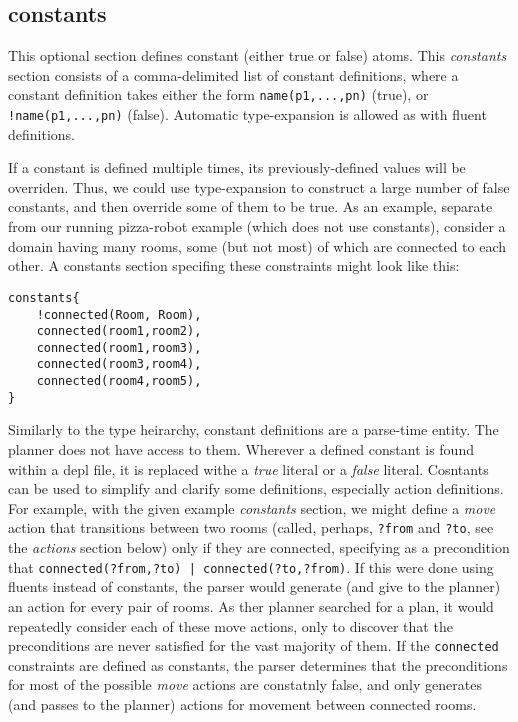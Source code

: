 \documentclass{article}
\begin{document}
{\subsection{constants}

This optional section defines constant (either true or false) atoms. This
\emph{constants} section consists of a comma-delimited list of constant
definitions, where a constant definition takes either the form
\verb|name(p1,...,pn)| (true), 
or
\verb|!name(p1,...,pn)| (false).
Automatic type-expansion is allowed as with fluent definitions.

If a constant is defined multiple times, its previously-defined values will be
overriden. Thus, we could use type-expansion to construct
a large number of false constants, and then
override some of them to be true. As an example, separate from our
running pizza-robot example (which does not use constants), consider a domain
having many rooms, some (but not most) of which are connected to each other.
A constants section specifing these constraints might look like this:

\begin{verbatim}
constants{
    !connected(Room, Room),
    connected(room1,room2),
    connected(room1,room3),
    connected(room3,room4),
    connected(room4,room5),
}
\end{verbatim}

Similarly to the type heirarchy, constant definitions are a parse-time entity.
The planner does not have access to them.
Wherever a defined constant is found within a depl file, it is replaced withe a
\emph{true} literal or a
\emph{false} literal.  Cosntants can be used to simplify and clarify some definitions,
especially action definitions. For example, with the given example
\emph{constants} section, we might define a \emph{move} action that transitions
between two rooms (called, perhaps, \verb|?from| and \verb|?to|, see the
\emph{actions} section below) only if they are connected, specifying as a
precondition that \verb"connected(?from,?to) | connected(?to,?from)".  If this
were done using fluents instead of constants,
the parser would generate (and give to the planner) an
action for every pair of rooms. As ther planner searched for a plan, it
would repeatedly consider each of these move actions, only to discover that the
preconditions are never satisfied for the vast majority of them. If
the \verb|connected| constraints are defined as constants, the parser determines that
the preconditions for most of the possible \emph{move} actions are constatnly
false, and only generates (and passes to the planner) actions for movement
between connected rooms.



}
\end{document}
